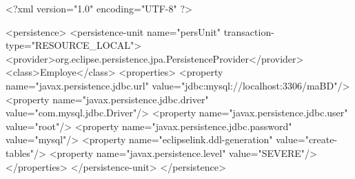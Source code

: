 \documentclass[xcolor=pdftex,x11names,table]{article}
\begin{document}
\pagestyle{empty}
\enlargethispage{100cm}
\addtolength{\textwidth}{8cm} 
\noindent\begin{minipage}{\textwidth}
\begin{code_xml}
<?xml version="1.0" encoding="UTF-8" ?>

<persistence>
  <persistence-unit name="persUnit" transaction-type="RESOURCE_LOCAL">
    <provider>org.eclipse.persistence.jpa.PersistenceProvider</provider>
    <class>Employe</class>
    <properties>
      <property name="javax.persistence.jdbc.url"  value="jdbc:mysql://localhost:3306/maBD"/>
      <property name="javax.persistence.jdbc.driver"  value="com.mysql.jdbc.Driver"/>
      <property name="javax.persistence.jdbc.user"  value="root"/>
      <property name="javax.persistence.jdbc.password"  value="mysql"/>
      <property name="eclipselink.ddl-generation"  value="create-tables"/>
      <property name="javax.persistence.level"  value="SEVERE"/>
    </properties>
  </persistence-unit>
</persistence>
\end{code_xml}
\end{minipage}
\end{document}
